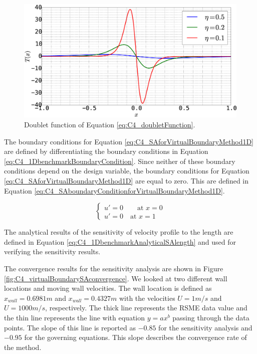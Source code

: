 \begin{figure}[H]
    \centering
    \includegraphics[width=12.00cm]{Chapter_4/figure/doubletFunction.eps}
    \caption{Doublet function of Equation \eqref{eq:C4_doubletFunction}.}
    \label{fig:C4_doubletFunction}
\end{figure}

The boundary conditions for Equation \eqref{eq:C4_SAforVirtualBoundaryMethod1D} are defined by differentiating the boundary conditions in Equation \eqref{eq:C4_1DbenchmarkBoundaryCondition}. Since neither of these boundary conditions depend on the design variable, the boundary conditions for Equation \eqref{eq:C4_SAforVirtualBoundaryMethod1D} are equal to zero. This are defined in Equation \eqref{eq:C4_SAboundaryConditionforVirtualBoundaryMethod1D}.

\begin{equation}\label{eq:C4_SAboundaryConditionforVirtualBoundaryMethod1D}
\begin{cases}
    u' = 0 \qquad \text{at } x = 0 \\
    u' = 0 \quad \text{at } x = 1
\end{cases}
\end{equation}

The analytical results of the sensitivity of velocity profile to the length are defined in Equation \eqref{eq:C4_1DbenchmarkAnalyticalSAlength} and used for verifying the sensitivity results.

The convergence results for the sensitivity analysis are shown in Figure \ref{fig:C4_virtualBoundarySAconvergence}. We looked at two different wall locations and moving wall velocities. The wall location is defined as $x_{wall} = 0.6981 m$ and $x_{wall} = 0.4327 m$ with the velocities $U = 1 m/s$ and $U = 1000 m/s$, respectively. The thick line represents the RSME data value and the thin line represents the line with equation $y = ax^b$ passing through the data points. The slope of this line is reported as $-0.85$ for the sensitivity analysis and $-0.95$ for the governing equations. This slope describes the convergence rate of the method.


